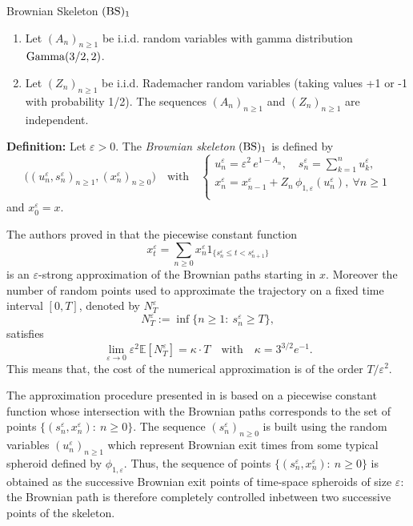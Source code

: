 \documentclass[12pt]{article}
\newcommand{\ds}{\displaystyle}
\numberwithin{equation}{section}
\begin{document}
\begin{framed}
\centerline{\sc Brownian Skeleton $({\rm BS})_1$}

\vspace*{0.2cm}
\begin{enumerate}
\item Let $(A_n)_{n\ge 1}$  be i.i.d. random variables with gamma distribution ${\rm Gamma}(3/2,2)$.
\item Let $(Z_n)_{n\geq 1}$ be i.i.d. Rademacher random variables (taking values +1 or -1 with probability 1/2). The sequences  $(A_n)_{n\ge 1}$ and $(Z_n)_{n\geq 1}$ are  independent.
\end{enumerate}


\noindent
{\bf  Definition:} Let $\varepsilon>0$. The \emph{Brownian skeleton} $({\rm BS})_1$ is defined by
\[
\Big((u_n^\varepsilon,s_n^\varepsilon)_{n\ge 1},(x_n^\varepsilon)_{n\ge 0}\Big)\quad\mbox{with}\quad \left\{
\begin{array}{l}
u_n^\varepsilon=\varepsilon^2 \,e^{1-A_n},\quad 
 s^\varepsilon_n=\ds\sum_{k=1}^nu_k^\varepsilon,\\[18pt]
  x_{n}^\varepsilon=x_{n-1}^\varepsilon+ Z_n \,\phi_{1,\varepsilon}( u_{n}^\varepsilon),\ \forall n\ge 1 \\
 \end{array}
 \right.
\]
and $x_0^\varepsilon=x$.
\end{framed}

The authors proved in \cite{deaconu2020strong} that the piecewise constant function 
\[
x^\varepsilon_t=\sum_{n\ge 0}x_n^\varepsilon1_{\{  s_n^\varepsilon \le t<s^\varepsilon_{n+1}\}}
\]
is an $\varepsilon$-strong approximation of the Brownian paths starting in $x$. Moreover the number of random points used to approximate the trajectory on a fixed time interval $[0,T]$, denoted by $N_T^\varepsilon$
\begin{equation}
\label{def:N}
N_T^\varepsilon:=\inf\{n\ge 1:\ s_n^\varepsilon\ge T\},
\end{equation}
satisfies
\[
\lim_{\varepsilon\to 0}\varepsilon^2\mathbb{E}[N^\varepsilon_T]=\kappa \cdot T\quad\mbox{with}\quad \kappa=3^{3/2}e^{-1}.
\]
This means that, the cost of the numerical approximation is of the order $T/\varepsilon^2$.

 The approximation procedure presented in \cite{deaconu2020strong} is based on a piecewise constant function whose intersection with the Brownian paths corresponds to the set of points $\{(s_n^\varepsilon,x_n^\varepsilon):\ n\ge 0\}$. The sequence $(s_n^\varepsilon)_{n\ge 0}$ is built using the random variables $(u_n^\varepsilon)_{n\ge 1}$ which represent Brownian exit times from some typical spheroid defined by $\phi_{1,\varepsilon}$. Thus, the sequence of points $\{(s_n^\varepsilon,x_n^\varepsilon):\ n\ge 0\}$ is obtained as the successive Brownian exit points of time-space spheroids of size $\varepsilon$: the Brownian path is therefore completely controlled inbetween two successive points of the skeleton. 
\end{document}
